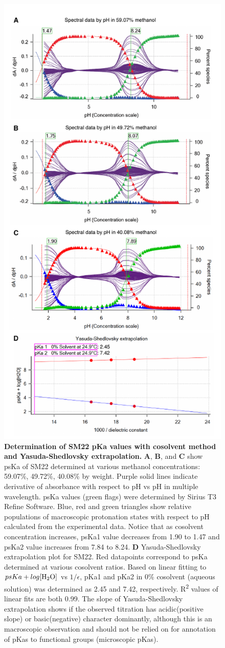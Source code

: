 \documentclass[9pt,lineno]{elife}
\begin{document}
\begin{figure}
\begin{center}
\includegraphics[width=0.5\linewidth]{figures/SM22_cosolvent_extrapolation_fig}
\caption{{\bf Determination of SM22 pKa values with cosolvent method and Yasuda-Shedlovsky extrapolation.} 
\textbf{A}, \textbf{B}, and \textbf{C} show psKa of SM22 determined at various methanol concentrations: 59.07\%, 49.72\%, 40.08\% by weight.  Purple solid lines indicate derivative of absorbance with respect to pH vs pH in multiple wavelength. psKa values (green flags) were determined by Sirius T3 Refine Software. Blue, red and green triangles show relative populations of macroscopic protonation states with respect to pH calculated from the experimental data. Notice that as cosolvent concentration increases, psKa1 value decreases from 1.90 to 1.47 and psKa2 value increases from 7.84 to 8.24. \textbf{D} Yasuda-Shedlovsky extrapolation plot for SM22. Red datapoints correspond to psKa determined at various cosolvent ratios. Based on linear fitting to $psKa + log [\ce{H2O}]$ vs $1/\epsilon$, pKa1 and pKa2 in 0\% cosolvent (aqueous solution) was determined as 2.45 and 7.42, respectively. R\textsuperscript{2} values of linear fits are both 0.99. The slope of Yasuda-Shedlovsky extrapolation shows if the observed titration has acidic(positive slope) or basic(negative) character dominantly, although this is an macroscopic observation and should not be relied on for annotation of pKas to functional groups (microscopic pKas).
} 
\label{fig:YS_extrapolation}
\end{center}
\end{figure}
\end{document}
